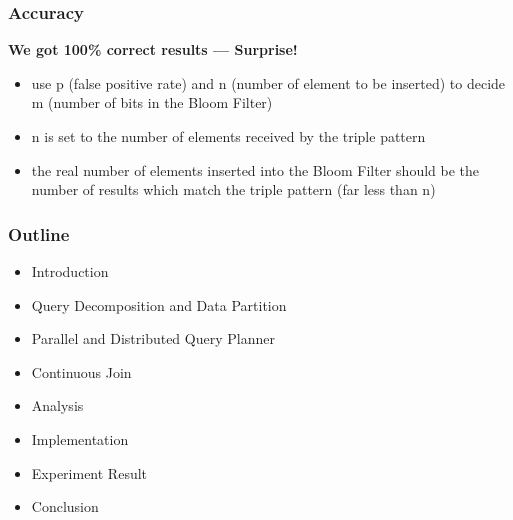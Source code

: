 \begin{frame}
\frametitle{Accuracy}
\textbf{We got 100\% correct results --- Surprise!}

\begin{itemize}
\item use p (false positive rate) and n (number of element to be inserted) to decide m (number of bits in the Bloom Filter)

\item n is set to the number of elements received by the triple pattern

\item the real number of elements inserted into the Bloom Filter should be the number of results which match the triple pattern (far less than n)
\end{itemize}

\end{frame}

\begin{frame}
\frametitle{Outline}
	\begin{itemize}
		\item Introduction
		\item Query Decomposition and Data Partition
		\item Parallel and Distributed Query Planner
		\item Continuous Join
		\item Analysis
		\item Implementation
		\item Experiment Result
		\item Conclusion
	\end{itemize}
\end{frame}


